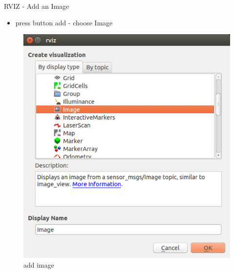 \documentclass{beamer}
\begin{document}
\begin{frame}{RVIZ - Add an Image}	

	\begin{itemize}
		\item press button add - choose Image
			
	\end{itemize}

	\begin{figure}[H]
		\centering
		\includegraphics[scale=0.3]{./Images/Add_Image.png}
		\caption{add image }
		\label{fig:ros_add_image}
	\end{figure}

\end{frame}
\end{document}

